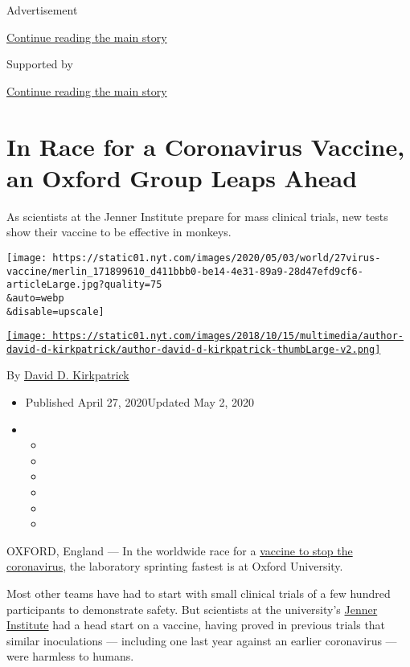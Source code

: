 Advertisement

\protect\hyperlink{after-top}{Continue reading the main story}

Supported by

\protect\hyperlink{after-sponsor}{Continue reading the main story}

\hypertarget{in-race-for-a-coronavirus-vaccine-an-oxford-group-leaps-ahead}{%
\section{In Race for a Coronavirus Vaccine, an Oxford Group Leaps
Ahead}\label{in-race-for-a-coronavirus-vaccine-an-oxford-group-leaps-ahead}}

As scientists at the Jenner Institute prepare for mass clinical trials,
new tests show their vaccine to be effective in monkeys.

\texttt{[image: https://static01.nyt.com/images/2020/05/03/world/27virus-vaccine/merlin\_171899610\_d411bbb0-be14-4e31-89a9-28d47efd9cf6-articleLarge.jpg?quality=75\\\&auto=webp\\\&disable=upscale]}

\href{https://www.nytimes.com/by/david-d-kirkpatrick}{\texttt{[image: https://static01.nyt.com/images/2018/10/15/multimedia/author-david-d-kirkpatrick/author-david-d-kirkpatrick-thumbLarge-v2.png]}}

By \href{https://www.nytimes.com/by/david-d-kirkpatrick}{David D.
Kirkpatrick}

\begin{itemize}
\item
  Published April 27, 2020Updated May 2, 2020
\item
  \begin{itemize}
  \item
  \item
  \item
  \item
  \item
  \item
  \end{itemize}
\end{itemize}

OXFORD, England --- In the worldwide race for a
\href{https://www.nytimes.com/2020/04/08/health/coronavirus-vaccines.html}{vaccine
to stop the coronavirus}, the laboratory sprinting fastest is at Oxford
University.

Most other teams have had to start with small clinical trials of a few
hundred participants to demonstrate safety. But scientists at the
university's \href{https://www.jenner.ac.uk/}{Jenner Institute} had a
head start on a vaccine, having proved in previous trials that similar
inoculations --- including one last year against an earlier coronavirus
--- were harmless to humans.

